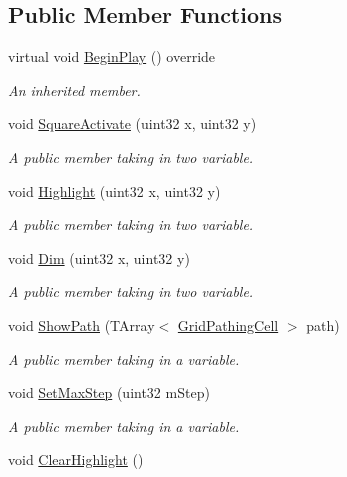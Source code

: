 \subsection*{Public Member Functions}
\begin{DoxyCompactItemize}
\item 
virtual void \hyperlink{class_a_unreal_grid_a9f2e41aff1d7918e7bf46a93432ced89}{Begin\+Play} () override
\begin{DoxyCompactList}\small\item\em An inherited member. \end{DoxyCompactList}\item 
void \hyperlink{class_a_unreal_grid_ac418fa2ea58ef9c00939f441ccdff8d4}{Square\+Activate} (uint32 x, uint32 y)
\begin{DoxyCompactList}\small\item\em A public member taking in two variable. \end{DoxyCompactList}\item 
void \hyperlink{class_a_unreal_grid_ab6dd0588dcf8892df18183d9eae54036}{Highlight} (uint32 x, uint32 y)
\begin{DoxyCompactList}\small\item\em A public member taking in two variable. \end{DoxyCompactList}\item 
void \hyperlink{class_a_unreal_grid_a18fad8e1af79ff004c54c0a05b171f01}{Dim} (uint32 x, uint32 y)
\begin{DoxyCompactList}\small\item\em A public member taking in two variable. \end{DoxyCompactList}\item 
void \hyperlink{class_a_unreal_grid_a4de19b986295141d8a1b31ef872a2f43}{Show\+Path} (T\+Array$<$ \hyperlink{class_grid_pathing_cell}{Grid\+Pathing\+Cell} $>$ path)
\begin{DoxyCompactList}\small\item\em A public member taking in a variable. \end{DoxyCompactList}\item 
void \hyperlink{class_a_unreal_grid_a7c1328560c61da12f8e515f149457999}{Set\+Max\+Step} (uint32 m\+Step)
\begin{DoxyCompactList}\small\item\em A public member taking in a variable. \end{DoxyCompactList}\item 
void \hyperlink{class_a_unreal_grid_a53493ad37970ddcdf437475740fa73ac}{Clear\+Highlight} ()

\end{DoxyCompactItemize}
